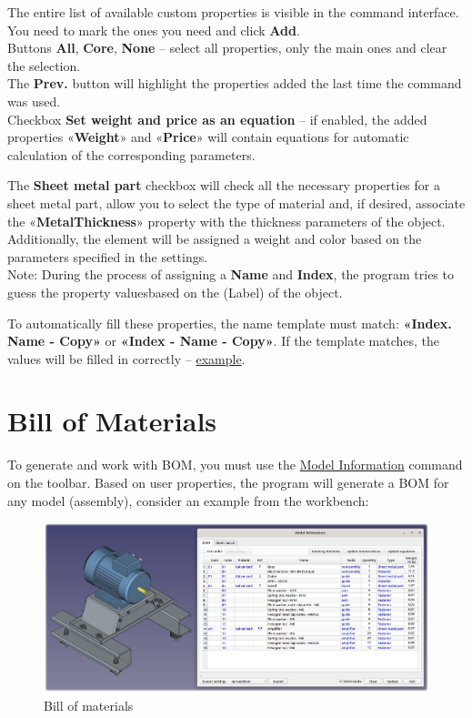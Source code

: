 \documentclass[a4paper,12pt]{article}
\begin{document}
The entire list of available custom properties is visible in the command interface. You need to mark the ones you need and click \textbf{Add}.\\

Buttons \textbf{All}, \textbf{Core}, \textbf{None} -- select all properties, only the main ones and clear the selection.\\The \textbf{Prev.} button will highlight the properties added the last time the command was used.\\

Checkbox \textbf{Set weight and price as an equation} -- if enabled, the added properties «\textbf{Weight}» and «\textbf{Price}» will contain equations for automatic calculation of the corresponding parameters.

The \textbf{Sheet metal part} checkbox will check all the necessary properties for a sheet metal part, allow you to select the type of material and, if desired, associate the «\textbf{MetalThickness}» property with the thickness parameters of the object. Additionally, the element will be assigned a weight and color based on the parameters specified in the settings.\\

Note: During the process of assigning a \textbf{Name} and \textbf{Index}, the program tries to guess the property values ​​based on the (Label) of the object.

To automatically fill these properties, the name template must match: \textbf{«Index. Name - Copy»} or \textbf{«Index - Name - Copy»}. If the template matches, the values ​​will be filled in correctly -- \hyperref[sec:properties]{example}.

\pagebreak




\section{Bill of Materials}

To generate and work with BOM, you must use the \hyperref[sec:4]{Model Information} command on the toolbar. Based on user properties, the program will generate a BOM for any model (assembly), consider an example from the workbench:

\begin{figure}[htp]
	\centering
	\includegraphics[width=1\textwidth]{img/info_bom.png}
	\caption{Bill of materials}
	\label{sec:info_bom}
\end{figure}
\end{document}
